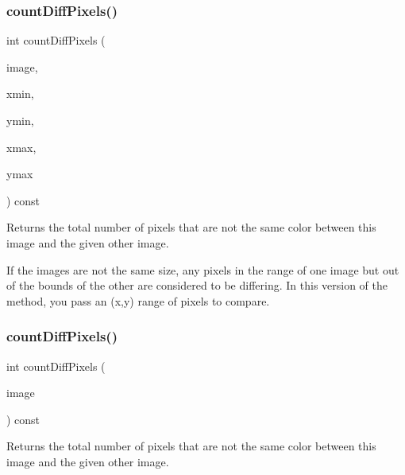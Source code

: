 \subsubsection{\texorpdfstring{count\+Diff\+Pixels()}{countDiffPixels()}\hspace{0.1cm}{\footnotesize\ttfamily [2/4]}}
{\footnotesize\ttfamily int count\+Diff\+Pixels (\begin{DoxyParamCaption}\item[{const \mbox{\hyperlink{classsgl_1_1GCanvas}{G\+Canvas}} \&}]{image,  }\item[{int}]{xmin,  }\item[{int}]{ymin,  }\item[{int}]{xmax,  }\item[{int}]{ymax }\end{DoxyParamCaption}) const\hspace{0.3cm}{\ttfamily [virtual]}}



Returns the total number of pixels that are not the same color between this image and the given other image. 

If the images are not the same size, any pixels in the range of one image but out of the bounds of the other are considered to be differing. In this version of the method, you pass an (x,y) range of pixels to compare. \mbox{\label{classsgl_1_1GCanvas_a443b0f63a197c0f1147b13077f4206e0}} 
\subsubsection{\texorpdfstring{count\+Diff\+Pixels()}{countDiffPixels()}\hspace{0.1cm}{\footnotesize\ttfamily [3/4]}}
{\footnotesize\ttfamily int count\+Diff\+Pixels (\begin{DoxyParamCaption}\item[{const \mbox{\hyperlink{classsgl_1_1GCanvas}{G\+Canvas}} $\ast$}]{image }\end{DoxyParamCaption}) const\hspace{0.3cm}{\ttfamily [virtual]}}



Returns the total number of pixels that are not the same color between this image and the given other image. 

